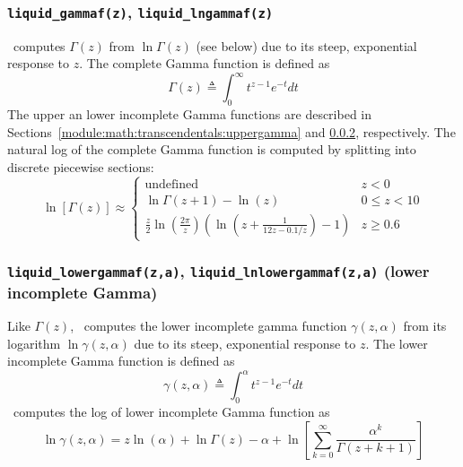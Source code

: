 \subsubsection{{\tt liquid\_gammaf(z)}, {\tt liquid\_lngammaf(z)}}
\label{module:math:transcendentals:gamma}
\liquid\ computes $\Gamma(z)$ from $\ln\Gamma(z)$
(see below) due to its steep, exponential response to $z$.
The complete Gamma function is defined as
%
\begin{equation}
\label{eqn:math:gamma}
    \Gamma(z) \triangleq \int_0^\infty{t^{z-1}e^{-t}dt}
\end{equation}
%
The upper an lower incomplete Gamma functions are described in
Sections~\ref{module:math:transcendentals:uppergamma} and
         \ref{module:math:transcendentals:lowergamma},
respectively.
%
The natural log of the complete Gamma function is computed by splitting
into discrete piecewise sections:
%
\begin{equation}
\label{eqn:math:lngamma}
    \ln\left[ \Gamma(z) \right] \approx
    \begin{cases}
        \text{undefined}
        & z < 0 \\
        \ln\Gamma(z+1) - \ln(z)
        & 0 \le z < 10 \\
        \frac{z}{2} \ln\left( \frac{2\pi}{z} \right)
        \left(
            \ln\left(z + \frac{1}{12 z - 0.1/z} \right) - 1
        \right)
        & z \ge 0.6
    \end{cases}
\end{equation}
%


% 
%
\subsubsection{{\tt liquid\_lowergammaf(z,a)},
               {\tt liquid\_lnlowergammaf(z,a)}
               (lower incomplete Gamma)}
\label{module:math:transcendentals:lowergamma}
Like $\Gamma(z)$,
\liquid\ computes the lower incomplete gamma function
$\gamma(z,\alpha)$ from its logarithm $\ln\gamma(z,\alpha)$
due to its steep, exponential response to $z$.
The lower incomplete Gamma function is defined as
%
\begin{equation}
\label{eqn:math:lowergamma}
    \gamma(z,\alpha) \triangleq \int_0^\alpha{ t^{z-1}e^{-t}dt }
\end{equation}
%
\liquid\ computes the log of lower incomplete Gamma function as
%
\begin{equation}
\label{eqn:math:lnlowergamma}
    \ln\gamma(z,\alpha) =
        z \ln(\alpha) +
        \ln\Gamma(z) -
        \alpha +
        \ln\left[
            \sum_{k=0}^\infty{
                \frac{\alpha^k}{\Gamma(z + k + 1)}
            }
        \right]
\end{equation}
%



